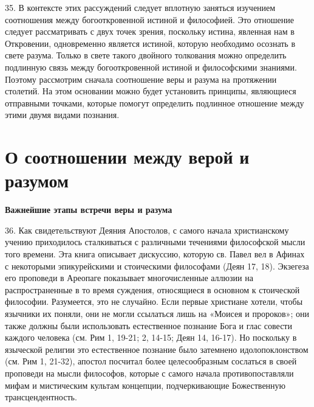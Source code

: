 \documentclass[a5paper,10pt]{article}
\begin{document}
35. В контексте этих рассуждений следует вплотную заняться изучением
соотношения между богооткровенной истиной и философией. Это отношение следует
рассматривать с двух точек зрения, поскольку истина, явленная нам в Откровении,
одновременно является истиной, которую необходимо осознать в свете разума.
Только в свете такого двойного толкования можно определить подлинную связь
между богооткровенной истиной и философскими знаниями. Поэтому рассмотрим
сначала соотношение веры и разума на протяжении столетий. На этом основании
можно будет установить принципы, являющиеся отправными точками, которые помогут
определить подлинное отношение между этими двумя видами познания.

\section{О соотношении между верой и разумом}

\textbf{Важнейшие этапы встречи веры и разума}

36. Как свидетельствуют Деяния Апостолов, с самого начала христианскому учению
приходилось сталкиваться с различными течениями философской мысли того времени.
Эта книга описывает дискуссию, которую св. Павел вел в Афинах с некоторыми
эпикурейскими и стоическими философами (Деян 17, 18). Экзегеза его проповеди в
Ареопаге показывает многочисленные аллюзии на распространенные в то время
суждения, относящиеся в основном к стоической философии. Разумеется, это не
случайно. Если первые христиане хотели, чтобы язычники их поняли, они не могли
ссылаться лишь на «Моисея и пророков»; они также должны были использовать
естественное познание Бога и глас совести каждого человека (см. Рим 1, 19-21;
2, 14-15; Деян 14, 16-17). Но поскольку в языческой религии это естественное
познание было затемнено идолопоклонством (см. Рим 1, 21-32), апостол посчитал
более целесообразным сослаться в своей проповеди на мысли философов, которые с
самого начала противопоставляли мифам и мистическим культам концепции,
подчеркивающие Божественную трансцендентность.
\end{document}
